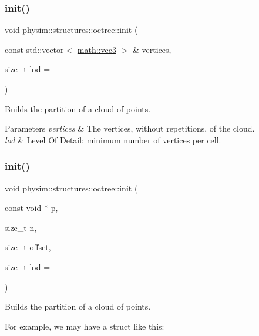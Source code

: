 \subsubsection{\texorpdfstring{init()}{init()}\hspace{0.1cm}{\footnotesize\ttfamily [2/3]}}
{\footnotesize\ttfamily void physim\+::structures\+::octree\+::init (\begin{DoxyParamCaption}\item[{const std\+::vector$<$ \hyperlink{structphysim_1_1math_1_1vec3}{math\+::vec3} $>$ \&}]{vertices,  }\item[{size\+\_\+t}]{lod = {} }\end{DoxyParamCaption})}



Builds the partition of a cloud of points. 


\begin{DoxyParams}{Parameters}
{\em vertices} & The vertices, without repetitions, of the cloud. \\
\hline
{\em lod} & Level Of Detail\+: minimum number of vertices per cell. \\
\hline
\end{DoxyParams}
\mbox{\label{classphysim_1_1structures_1_1octree_a193143baa82a028ca9f7c65d69b48246}} 
\subsubsection{\texorpdfstring{init()}{init()}\hspace{0.1cm}{\footnotesize\ttfamily [3/3]}}
{\footnotesize\ttfamily void physim\+::structures\+::octree\+::init (\begin{DoxyParamCaption}\item[{const void $\ast$}]{p,  }\item[{size\+\_\+t}]{n,  }\item[{size\+\_\+t}]{offset,  }\item[{size\+\_\+t}]{lod = {} }\end{DoxyParamCaption})}



Builds the partition of a cloud of points. 

For example, we may have a struct like this\+:

